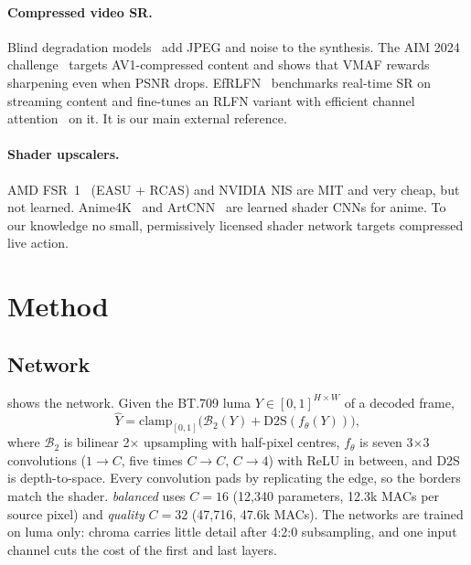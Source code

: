 \documentclass[10pt,twocolumn,letterpaper]{article}
\begin{document}
\paragraph{Compressed video SR.} Blind degradation models~\cite{bsrgan,realesrgan} add JPEG and
noise to the synthesis. The AIM 2024 challenge~\cite{aim24} targets AV1-compressed content and
shows that VMAF rewards sharpening even when PSNR drops. EfRLFN~\cite{efrlfn} benchmarks
real-time SR on streaming content and fine-tunes an RLFN variant with efficient channel
attention~\cite{eca} on it. It is our main external reference.

\paragraph{Shader upscalers.} AMD FSR~1~\cite{fsr} (EASU + RCAS) and NVIDIA NIS are MIT and very
cheap, but not learned. Anime4K~\cite{anime4k} and ArtCNN~\cite{artcnn} are learned shader CNNs
for anime. To our knowledge no small, permissively licensed shader network targets compressed
live action.

\section{Method}

\subsection{Network}
 shows the network. Given the BT.709 luma $Y\in[0,1]^{H\times W}$ of a decoded frame,
\begin{equation}
\hat Y = \mathrm{clamp}_{[0,1]}\big(\mathcal{B}_{2}(Y) + \mathrm{D2S}(f_\theta(Y))\big),
\end{equation}
where $\mathcal{B}_2$ is bilinear 2$\times$ upsampling with half-pixel centres, $f_\theta$ is seven
3$\times$3 convolutions ($1\to C$, five times $C\to C$, $C\to4$) with ReLU in between, and D2S is
depth-to-space. Every convolution pads by replicating the edge, so the borders match the shader.
\emph{balanced} uses $C=16$ (12{,}340 parameters, 12.3k MACs per source pixel) and \emph{quality}
$C=32$ (47{,}716, 47.6k MACs). The networks are trained on luma only: chroma carries little detail
after 4:2:0 subsampling, and one input channel cuts the cost of the first and last layers.
\end{document}
